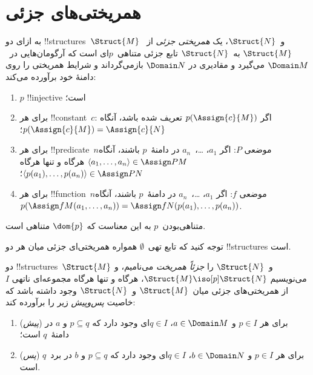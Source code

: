 \documentclass[../../../include/open-logic-section]{subfiles}
\begin{document}
\section{همریختی‌های جزئی}

\begin{defn}
  به ازای دو !!{structure}s~$\Struct{M}$ و~$\Struct{N}$، یک
  \emph{همریختی جزئی} از~$\Struct{M}$ به~$\Struct{N}$ تابع جزئی
  متناهی~$p$ای است که آرگومان‌هایی در~$\Domain M$ می‌گیرد و مقادیری در
  $\Domain N$ بازمی‌گرداند و شرایط همریختی
   را روی دامنهٔ خود برآورده می‌کند:
  \begin{enumerate}
  \item $p$ !!{injective} است؛
  \item برای هر !!{constant}~$c$: اگر $p(\Assign{c}{M})$ تعریف شده
    باشد، آنگاه $p(\Assign{c}{M}) = \Assign{c}{N}$؛
  \item برای هر !!{predicate}~$n$موضعی $P$: اگر
    $a_1$، \dots،~$a_n$ در دامنهٔ~$p$ باشند، آنگاه
    $\langle a_1, \dots, a_n\rangle \in \Assign P M$ هرگاه و تنها
    هرگاه $\langle p(a_1), \dots, p(a_n) \rangle
    \in \Assign P N$؛
  \item برای هر !!{function}~$n$موضعی $f$: اگر
    $a_1$، \dots،~$a_n$ در دامنهٔ~$p$ باشند، آنگاه
    $p(\Assign f M (a_1, \dots,a_n))
    = \Assign f N (p(a_1), \dots, p(a_n))$.
  \end{enumerate}
  متناهی‌بودن~$p$ به این معناست که $\dom{p}$ متناهی است.
\end{defn}

توجه کنید که تابع تهی~$\emptyset$ همواره همریختی‌ای جزئی میان هر دو
!!{structure}s است.

\begin{defn}
  دو !!{structure}s~$\Struct{M}$ و~$\Struct{N}$ را
  \emph{جزئاً همریخت} می‌نامیم، و می‌نویسیم
  $\Struct{M} \iso[p] \Struct{N}$، هرگاه و تنها هرگاه مجموعه‌ای ناتهی
  $I$ از همریختی‌های جزئی میان~$\Struct{M}$ و~$\Struct{N}$ وجود داشته
  باشد که خاصیت \emph{پس‌وپیش} زیر را برآورده کند:
  \begin{enumerate}
  \item (\emph{پیش}) برای هر $p \in I$ و $a \in \Domain M$،
    $q \in I$ای وجود دارد که $p \subseteq q$ و $a$ در دامنهٔ~$q$ است؛
  \item (\emph{پس}) برای هر $p \in I$ و $b \in \Domain N$،
    $q \in I$ای وجود دارد که $p \subseteq q$ و $b$ در برد~$q$ است.
  \end{enumerate}
\end{defn}
\end{document}
